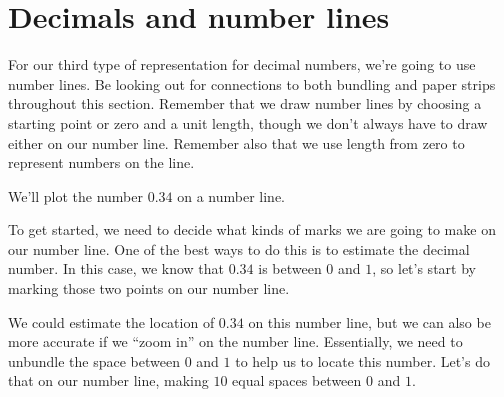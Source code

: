 \documentclass{ximera}
\begin{document}
\section{Decimals and number lines}

For our third type of representation for decimal numbers, we're going to use number lines. Be looking out for connections to both bundling and paper strips throughout this section. Remember that we draw number lines by choosing a starting point or zero and a unit length, though we don't always have to draw either on our number line. Remember also that we use length from zero to represent numbers on the line. 

\begin{example}
We'll plot the number $0.34$ on a number line.

To get started, we need to decide what kinds of marks we are going to make on our number line. One of the best ways to do this is to estimate the decimal number. In this case, we know that $0.34$ is between $0$ and $1$, so let's start by marking those two points on our number line.

\begin{image}
\end{image}

We could estimate the location of $0.34$ on this number line, but we can also be more accurate if we ``zoom in'' on the number line. Essentially, we need to unbundle the space between $0$ and $1$ to help us to locate this number. Let's do that on our number line, making $10$ equal spaces between $0$ and $1$.

\begin{image}
\end{image}


\end{example}
\end{document}
